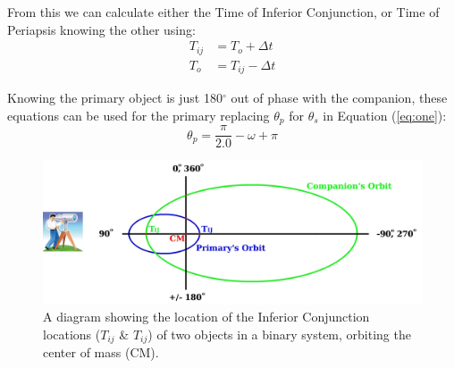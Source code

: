 \documentclass[12pt,preprint]{aastex}
\begin{document}

From this we can calculate either the Time of Inferior Conjunction, or Time of Periapsis knowing the other using:
\begin{subequations}
\begin{align}
T_{ij} &= T_{o}+\Delta t\\
T_o &= T_{ij}-\Delta t
\end{align}
\end{subequations}



Knowing the primary object is just 180$^{\circ}$ out of phase with the companion, these equations can be used for the primary replacing $\theta_p$ for $\theta_s$ in Equation (\ref{eq:one}):
\begin{equation}
\theta_p = \frac{\pi}{2.0}-\omega+\pi
\end{equation}


\begin{figure}[htp]
\begin{center}
\includegraphics[scale=0.31]{Figures/TcToEllipses2-withTelescope4.jpeg}
\caption[Binary Inferior Conjunction Diagram]{A diagram showing the location of the Inferior Conjunction locations ({\color{green}$T_{ij}$} \& {\color{blue}$T_{ij}$}) of two objects in a binary system, orbiting the center of mass ({\color{red}CM}).}
\label{fig:ToTcDiagram}
\end{center}
\end{figure}
\end{document}
